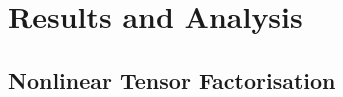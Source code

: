 
\ifpdf
     \graphicspath{{/Users/luyolomagangane/Documents/Academics/Figures/Chapter5/}}
\else
    \graphicspath{{Chapter1/Figs/Vector/}{Chapter1/Figs/}}
\fi

\chapter{Results and Analysis}  %

\section{Nonlinear Tensor Factorisation}
